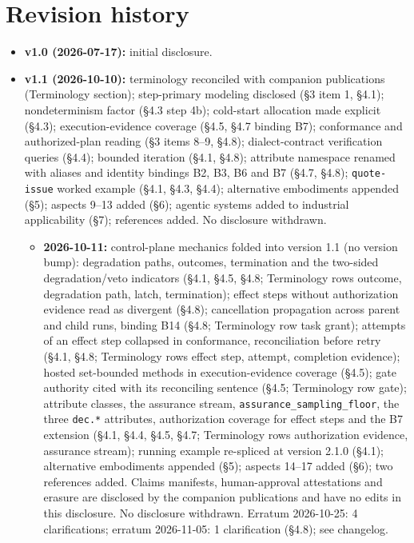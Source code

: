 \documentclass[11pt]{article}
\newcommand{\code}[1]{\texttt{#1}}
\begin{document}
\section{Revision history}
\begin{itemize}
\item \textbf{v1.0 (2026-07-17):} initial disclosure.
\item \textbf{v1.1 (2026-10-10):} terminology reconciled with companion publications (Terminology section); step-primary modeling disclosed (\S3 item 1, \S4.1); nondeterminism factor (\S4.3 step 4b); cold-start allocation made explicit (\S4.3); execution-evidence coverage (\S4.5, \S4.7 binding B7); conformance and authorized-plan reading (\S3 items 8--9, \S4.8); dialect-contract verification queries (\S4.4); bounded iteration (\S4.1, \S4.8); attribute namespace renamed with aliases and identity bindings B2, B3, B6 and B7 (\S4.7, \S4.8); \code{quote-issue} worked example (\S4.1, \S4.3, \S4.4); alternative embodiments appended (\S5); aspects 9--13 added (\S6); agentic systems added to industrial applicability (\S7); references added. No disclosure withdrawn.
\begin{itemize}
\item \textbf{2026-10-11:} control-plane mechanics folded into version 1.1 (no version bump): degradation paths, outcomes, termination and the two-sided degradation/veto indicators (\S4.1, \S4.5, \S4.8; Terminology rows outcome, degradation path, latch, termination); effect steps without authorization evidence read as divergent (\S4.8); cancellation propagation across parent and child runs, binding B14 (\S4.8; Terminology row task grant); attempts of an effect step collapsed in conformance, reconciliation before retry (\S4.1, \S4.8; Terminology rows effect step, attempt, completion evidence); hosted set-bounded methods in execution-evidence coverage (\S4.5); gate authority cited with its reconciling sentence (\S4.5; Terminology row gate); attribute classes, the assurance stream, \code{assurance\_sampling\_floor}, the three \code{dec.*} attributes, authorization coverage for effect steps and the B7 extension (\S4.1, \S4.4, \S4.5, \S4.7; Terminology rows authorization evidence, assurance stream); running example re-spliced at version 2.1.0 (\S4.1); alternative embodiments appended (\S5); aspects 14--17 added (\S6); two references added. Claims manifests, human-approval attestations and erasure are disclosed by the companion publications and have no edits in this disclosure. No disclosure withdrawn. Erratum 2026-10-25: 4 clarifications; erratum 2026-11-05: 1 clarification (\S4.8); see changelog.
\end{itemize}
\end{itemize}
\end{document}
